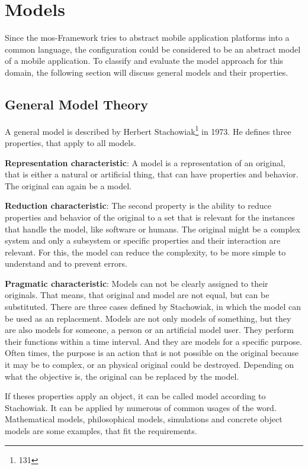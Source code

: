 \section{Models}

Since the mos-Framework tries to abstract mobile application platforms into a common language, the configuration could be considered to be an abstract model of a mobile application.
To classify and evaluate the model approach for this domain, the following section will discuss general models and their properties.

\subsection{General Model Theory}
\label{generalmodeltheory}

A general model is described by Herbert Stachowiak\footnote{\cite{stachowiak_allgemeine_1973} 131} in 1973.
He defines three properties, that apply to all models.

\textbf{Representation characteristic}: A model is a representation of an original, that is either a natural or artificial thing, that can have properties and behavior.
The original can again be a model.

\textbf{Reduction characteristic}: The second property is the ability to reduce properties and behavior of the original to a set that is relevant for the instances that handle the model, like software or humans.
The original might be a complex system and only a subsystem or specific properties and their interaction are relevant.
For this, the model can reduce the complexity, to be more simple to understand and to prevent errors.

\textbf{Pragmatic characteristic}: Models can not be clearly assigned to their originals.
That means, that original and model are not equal, but can be substituted.
There are three cases defined by Stachowiak, in which the model can be used as an replacement.
Models are not only models of something, but they are also models for someone, a person or an artificial model user.
They perform their functions within a time interval.
And they are models for a specific purpose.
Often times, the purpose is an action that is not possible on the original because it may be to complex, or an physical original could be destroyed.
Depending on what the objective is, the original can be replaced by the model.

If theses properties apply an object, it can be called model according to Stachowiak.
It can be applied by numerous of common usages of the word.
Mathematical models, philosophical models, simulations and concrete object models are some examples, that fit the requirements.

